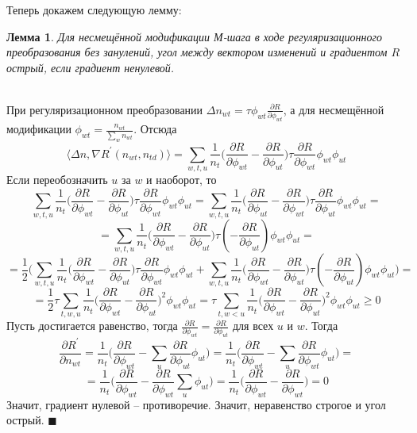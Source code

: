 \documentclass[12pt]{article}
\newtheorem{lemma}[remark]{Лемма}
\newenvironment{Proof} 
	{\par\noindent{\bf Доказательство.}} 
	{\hfill$\blacksquare$}
\renewcommand{\geq}{\geqslant}
\begin{document}
Теперь докажем следующую лемму:
\begin{lemma}           
 Для несмещённой модификации М-шага в ходе регуляризационного преобразования  без занулений, угол  между вектором изменений и градиентом $R$ острый, если градиент ненулевой.
\end{lemma}
\begin{Proof}\\
При регуляризационном преобразовании $\Delta n_{wt} = \tau \phi_{wt} \frac{\partial{R}}{\partial{\phi_{wt}}}$, а для несмещённой модификации $\phi_{wt} = \frac{n_{wt}}{\sum\limits_w n_{wt}}$. Отсюда
\[
\langle \Delta n, \nabla R^{\prime}(n_{wt}, n_{td})\rangle = \sum\limits_{w, t, u}  \frac{1}{n_{t}}  \bigg(  \frac{\partial{R}}{\partial{\phi_{wt}}}  -  \frac{\partial{R}}{\partial{\phi_{ut}}}  \bigg)  \tau \frac{\partial{R}}{\partial{\phi_{wt}}} \phi_{wt} \phi_{ut}
\]
Если переобозначить $u$ за $w$ и наоборот, то 
\[
\sum\limits_{w, t, u}  \frac{1}{n_{t}}  \bigg(  \frac{\partial{R}}{\partial{\phi_{wt}}}  -  \frac{\partial{R}}{\partial{\phi_{ut}}}  \bigg)  \tau \frac{\partial{R}}{\partial{\phi_{wt}}} \phi_{wt} \phi_{ut}  = \sum\limits_{w, t, u}  \frac{1}{n_{t}}  \bigg(  \frac{\partial{R}}{\partial{\phi_{ut}}}  -  \frac{\partial{R}}{\partial{\phi_{wt}}}  \bigg)  \tau \frac{\partial{R}}{\partial{\phi_{ut}}} \phi_{wt} \phi_{ut} = 
\]
\[
= \sum\limits_{w, t, u}  \frac{1}{n_{t}}  \bigg(  \frac{\partial{R}}{\partial{\phi_{wt}}}  -  \frac{\partial{R}}{\partial{\phi_{ut}}}  \bigg)  \tau \left(-\frac{\partial{R}}{\partial{\phi_{ut}}}\right) \phi_{wt} \phi_{ut} = 
\]
\[
= \frac12 \bigg(\sum\limits_{w, t, u}  \frac{1}{n_{t}}  \bigg(  \frac{\partial{R}}{\partial{\phi_{wt}}}  -  \frac{\partial{R}}{\partial{\phi_{ut}}}  \bigg)  \tau \frac{\partial{R}}{\partial{\phi_{wt}}} \phi_{wt} \phi_{ut} +  \sum\limits_{w, t, u}  \frac{1}{n_{t}}  \bigg(  \frac{\partial{R}}{\partial{\phi_{wt}}}  -  \frac{\partial{R}}{\partial{\phi_{ut}}}  \bigg)  \tau \left(-\frac{\partial{R}}{\partial{\phi_{ut}}}\right) \phi_{wt} \phi_{ut} \bigg)= 
\]
\[
= \frac12 \tau \sum\limits_{t, w, u}  \frac{1}{n_{t}} \bigg(  \frac{\partial{R}}{\partial{\phi_{wt}}}  -  \frac{\partial{R}}{\partial{\phi_{ut}}}  \bigg)^2 \phi_{wt} \phi_{ut} = \tau \sum\limits_{t, w < u}  \frac{1}{n_{t}} \bigg(  \frac{\partial{R}}{\partial{\phi_{wt}}}  -  \frac{\partial{R}}{\partial{\phi_{ut}}}  \bigg)^2 \phi_{wt} \phi_{ut} \geq 0
\]
Пусть достигается равенство, тогда $\frac{\partial{R}}{\partial{\phi_{wt}}}  =  \frac{\partial{R}}{\partial{\phi_{ut}}}$ для всех $u$ и $w$. Тогда
\[
\frac{\partial{R^{\prime}}}{\partial{n_{wt}}} = \frac{1}{n_t} \bigg( \frac{\partial{R}}{\partial{\phi_{wt}}} - \sum_{u}  \frac{\partial{R}}{\partial{\phi_{ut}}} \phi_{ut} \bigg) = \frac{1}{n_t} \bigg( \frac{\partial{R}}{\partial{\phi_{wt}}} - \sum_{u}  \frac{\partial{R}}{\partial{\phi_{wt}}} \phi_{ut} \bigg) =
\]
\[
=\frac{1}{n_t} \bigg( \frac{\partial{R}}{\partial{\phi_{wt}}} - \frac{\partial{R}}{\partial{\phi_{wt}}} \sum_{u} \phi_{ut} \bigg)  = \frac{1}{n_t} \bigg( \frac{\partial{R}}{\partial{\phi_{wt}}} - \frac{\partial{R}}{\partial{\phi_{wt}}} \bigg) = 0
\]
Значит, градиент нулевой -- противоречие. Значит, неравенство строгое и угол острый.
\end{Proof}\ \\
\end{document}
